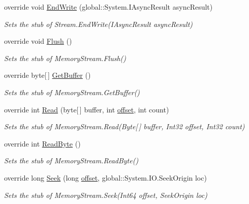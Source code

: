 \begin{DoxyCompactItemize}
override void \hyperlink{class_system_1_1_i_o_1_1_fakes_1_1_stub_memory_stream_adba4cfea108061fcadb8bacfc6c407eb}{End\-Write} (global\-::\-System.\-I\-Async\-Result async\-Result)
\begin{DoxyCompactList}\small\item\em Sets the stub of Stream.\-End\-Write(\-I\-Async\-Result async\-Result)\end{DoxyCompactList}\item 
override void \hyperlink{class_system_1_1_i_o_1_1_fakes_1_1_stub_memory_stream_a38fde4b2c5c9cbf980e075e370bcbd48}{Flush} ()
\begin{DoxyCompactList}\small\item\em Sets the stub of Memory\-Stream.\-Flush()\end{DoxyCompactList}\item 
override byte\mbox{[}$\,$\mbox{]} \hyperlink{class_system_1_1_i_o_1_1_fakes_1_1_stub_memory_stream_a7d2b96cffd4061983cc4425e162633c2}{Get\-Buffer} ()
\begin{DoxyCompactList}\small\item\em Sets the stub of Memory\-Stream.\-Get\-Buffer()\end{DoxyCompactList}\item 
override int \hyperlink{class_system_1_1_i_o_1_1_fakes_1_1_stub_memory_stream_ade514a70d5af8c0ac0c647c386e4807d}{Read} (byte\mbox{[}$\,$\mbox{]} buffer, int \hyperlink{jquery-1_810_82_8js_a4a9f594d20d927164551fc7fa4751a2f}{offset}, int count)
\begin{DoxyCompactList}\small\item\em Sets the stub of Memory\-Stream.\-Read(\-Byte\mbox{[}$\,$\mbox{]} buffer, Int32 offset, Int32 count)\end{DoxyCompactList}\item 
override int \hyperlink{class_system_1_1_i_o_1_1_fakes_1_1_stub_memory_stream_a195e3113743de3a27fd5f8a977101260}{Read\-Byte} ()
\begin{DoxyCompactList}\small\item\em Sets the stub of Memory\-Stream.\-Read\-Byte()\end{DoxyCompactList}\item 
override long \hyperlink{class_system_1_1_i_o_1_1_fakes_1_1_stub_memory_stream_a1b9a1d66710b59735655f02159a7c293}{Seek} (long \hyperlink{jquery-1_810_82_8js_a4a9f594d20d927164551fc7fa4751a2f}{offset}, global\-::\-System.\-I\-O.\-Seek\-Origin loc)
\begin{DoxyCompactList}\small\item\em Sets the stub of Memory\-Stream.\-Seek(\-Int64 offset, Seek\-Origin loc)\end{DoxyCompactList}\item 

\end{DoxyCompactItemize}
